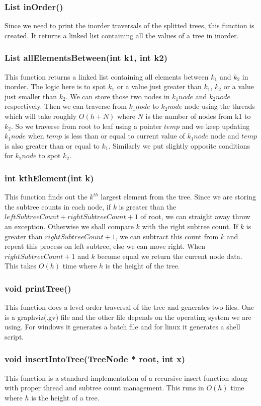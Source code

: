 \documentclass{article}
\begin{document}
\subsubsection{List inOrder()}
Since we need to print the inorder traversals of the splitted trees, this function is created. It returns a linked list containing all the values of a tree in inorder.
\subsubsection{List allElementsBetween(int k1, int k2)}
This function returns a linked list containing all elements between $k_1$ and $k_2$ in inorder. The logic here is to spot $k_1$ or a value just greater than $k_1$, $k_2$ or a value just smaller than $k_2$. We can store those two nodes in $k_1node$ and $k_2node$ respectively. Then we can traverse from $k_1node$ to $k_2node$ node using the threads which will take roughly $O(h+N)$ where $N$ is the number of nodes from k1 to $k_2$.\newline
So we traverse from root to leaf using a pointer $temp$ and we keep updating $k_1node$ when $temp$ is less than or equal to current value of $k_1node$ node and $temp$ is also greater than or equal to $k_1$. Similarly we put slightly opposite conditions for $k_2node$ to spot $k_2$.
\subsubsection{int kthElement(int k)}
This function finds out the $k^{th}$ largest element from the tree. Since we are storing the subtree counts in each node, if $k$ is greater than the $leftSubtreeCount+rightSubtreeCount+1$ of root, we can straight away throw an exception. Otherwise we shall compare $k$ with the right subtree count. If $k$ is greater than $rightSubtreeCount+1$, we can subtract this count from $k$ and repeat this process on left subtree, else we can move right. When $rightSubtreeCount+1$ and $k$ become equal we return the current node data. This takes $O(h)$ time where $h$ is the height of the tree. 
\subsubsection{void printTree()}
This function does a level order traversal of the tree and generates two files. One is a graphviz(.gv) file and the other file depends on the operating system we are using. For windows it generates a batch file and for linux it generates a shell script.
\subsubsection{void insertIntoTree(TreeNode * root, int x)}
\label{insertRec}
This function is a standard implementation of a recursive insert function along with proper thread and subtree count management. This runs in $O(h)$ time where $h$ is the height of a tree.
\end{document}
